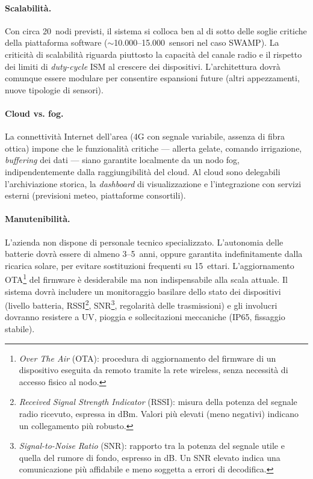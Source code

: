 \paragraph{Scalabilità.} Con circa 20~nodi previsti, il sistema si colloca ben al di sotto delle soglie critiche della piattaforma software ($\sim$10.000--15.000~sensori nel caso SWAMP). La criticità di scalabilità riguarda piuttosto la capacità del canale radio e il rispetto dei limiti di \textit{duty-cycle} ISM al crescere dei dispositivi. L'architettura dovrà comunque essere modulare per consentire espansioni future (altri appezzamenti, nuove tipologie di sensori).

\paragraph{Cloud vs. fog.} La connettività Internet dell'area (4G con segnale variabile, assenza di fibra ottica) impone che le funzionalità critiche --- allerta gelate, comando irrigazione, \textit{buffering} dei dati --- siano garantite localmente da un nodo fog, indipendentemente dalla raggiungibilità del cloud. Al cloud sono delegabili l'archiviazione storica, la \textit{dashboard} di visualizzazione e l'integrazione con servizi esterni (previsioni meteo, piattaforme consortili).

\paragraph{Manutenibilità.} L'azienda non dispone di personale tecnico specializzato. L'autonomia delle batterie dovrà essere di almeno 3--5~anni, oppure garantita indefinitamente dalla ricarica solare, per evitare sostituzioni frequenti su 15~ettari. L'aggiornamento OTA\footnote{\textit{Over The Air} (OTA): procedura di aggiornamento del firmware di un dispositivo eseguita da remoto tramite la rete wireless, senza necessità di accesso fisico al nodo.} del firmware è desiderabile ma non indispensabile alla scala attuale. Il sistema dovrà includere un monitoraggio basilare dello stato dei dispositivi (livello batteria, RSSI\footnote{\textit{Received Signal Strength Indicator} (RSSI): misura della potenza del segnale radio ricevuto, espressa in dBm. Valori più elevati (meno negativi) indicano un collegamento più robusto.}, SNR\footnote{\textit{Signal-to-Noise Ratio} (SNR): rapporto tra la potenza del segnale utile e quella del rumore di fondo, espresso in dB. Un SNR elevato indica una comunicazione più affidabile e meno soggetta a errori di decodifica.}, regolarità delle trasmissioni) e gli involucri dovranno resistere a UV, pioggia e sollecitazioni meccaniche (IP65, fissaggio stabile).


